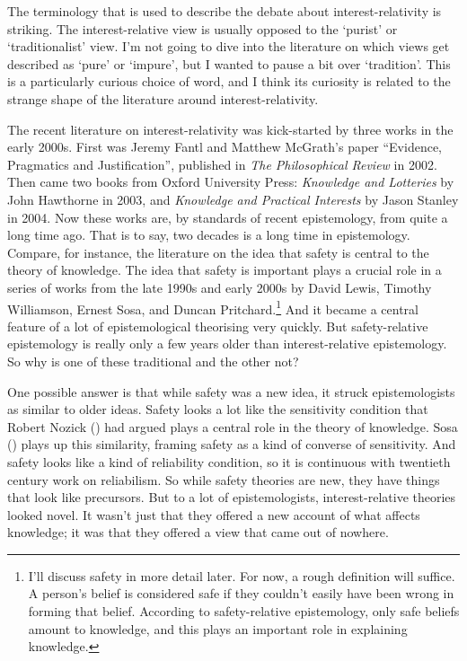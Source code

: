 \documentclass[
  10pt,
  letterpaper,
  twoside]{scrbook}
\begin{document}
The terminology that is used to describe the debate about
interest-relativity is striking. The interest-relative view is usually
opposed to the `purist' or `traditionalist' view. I'm not going to dive
into the literature on which views get described as `pure' or `impure',
but I wanted to pause a bit over `tradition'. This is a particularly
curious choice of word, and I think its curiosity is related to the
strange shape of the literature around interest-relativity.

The recent literature on interest-relativity was kick-started by three
works in the early 2000s. First was Jeremy Fantl and Matthew McGrath's
paper ``Evidence, Pragmatics and Justification'', published in \emph{The
Philosophical Review} in 2002. Then came two books from Oxford
University Press: \emph{Knowledge and Lotteries} by John Hawthorne in
2003, and \emph{Knowledge and Practical Interests} by Jason Stanley in
2004. Now these works are, by standards of recent epistemology, from
quite a long time ago. That is to say, two decades is a long time in
epistemology. Compare, for instance, the literature on the idea that
safety is central to the theory of knowledge. The idea that safety is
important plays a crucial role in a series of works from the late 1990s
and early 2000s by David Lewis, Timothy Williamson, Ernest Sosa, and
Duncan Pritchard.\footnote{I'll discuss safety in more detail later. For
  now, a rough definition will suffice. A person's belief is considered
  safe if they couldn't easily have been wrong in forming that belief.
  According to safety-relative epistemology, only safe beliefs amount to
  knowledge, and this plays an important role in explaining knowledge.}
And it became a central feature of a lot of epistemological theorising
very quickly. But safety-relative epistemology is really only a few
years older than interest-relative epistemology. So why is one of these
traditional and the other not?

One possible answer is that while safety was a new idea, it struck
epistemologists as similar to older ideas. Safety looks a lot like the
sensitivity condition that Robert Nozick
() had argued plays a central role in the
theory of knowledge. Sosa () plays up this
similarity, framing safety as a kind of converse of sensitivity. And
safety looks like a kind of reliability condition, so it is continuous
with twentieth century work on reliabilism. So while safety theories are
new, they have things that look like precursors. But to a lot of
epistemologists, interest-relative theories looked novel. It wasn't just
that they offered a new account of what affects knowledge; it was that
they offered a view that came out of nowhere.
\end{document}
